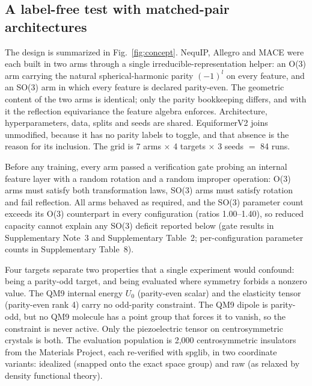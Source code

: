 \subsection*{A label-free test with matched-pair architectures}

The design is summarized in Fig.~\ref{fig:concept}. NequIP, Allegro and MACE were each built in two arms through a single irreducible-representation helper: an O(3) arm carrying the natural spherical-harmonic parity $(-1)^{l}$ on every feature, and an SO(3) arm in which every feature is declared parity-even. The geometric content of the two arms is identical; only the parity bookkeeping differs, and with it the reflection equivariance the feature algebra enforces. Architecture, hyperparameters, data, splits and seeds are shared. EquiformerV2 joins unmodified, because it has no parity labels to toggle, and that absence is the reason for its inclusion. The grid is 7 arms $\times$ 4 targets $\times$ 3 seeds $=$ 84 runs.

Before any training, every arm passed a verification gate probing an internal feature layer with a random rotation and a random improper operation: O(3) arms must satisfy both transformation laws, SO(3) arms must satisfy rotation and fail reflection. All arms behaved as required, and the SO(3) parameter count exceeds its O(3) counterpart in every configuration (ratios 1.00--1.40), so reduced capacity cannot explain any SO(3) deficit reported below (gate results in Supplementary Note~3 and Supplementary Table~2; per-configuration parameter counts in Supplementary Table~8).

Four targets separate two properties that a single experiment would confound: being a parity-odd target, and being evaluated where symmetry forbids a nonzero value. The QM9 internal energy $U_0$ (parity-even scalar) and the elasticity tensor (parity-even rank 4) carry no odd-parity constraint. The QM9 dipole is parity-odd, but no QM9 molecule has a point group that forces it to vanish, so the constraint is never active. Only the piezoelectric tensor on centrosymmetric crystals is both. The evaluation population is 2,000 centrosymmetric insulators from the Materials Project\cite{jain2013materials}, each re-verified with spglib\cite{togo2024spglib}, in two coordinate variants: idealized (snapped onto the exact space group) and raw (as relaxed by density functional theory).

